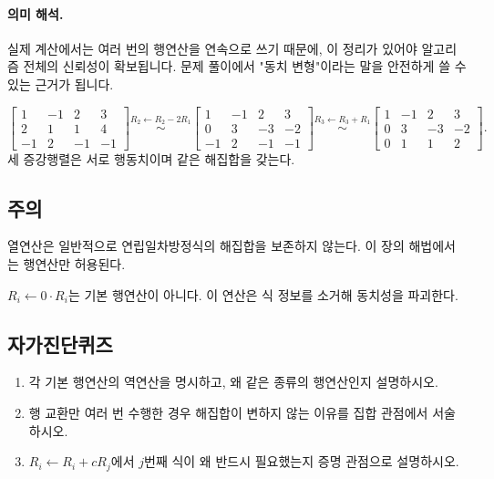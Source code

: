 \paragraph{의미 해석.}
실제 계산에서는 여러 번의 행연산을 연속으로 쓰기 때문에, 이 정리가 있어야 알고리즘 전체의 신뢰성이 확보됩니다. 문제 풀이에서 "동치 변형"이라는 말을 안전하게 쓸 수 있는 근거가 됩니다.

\begin{example}
\[
\left[
\begin{array}{ccc|c}
1&-1&2&3\\
2&1&1&4\\
-1&2&-1&-1
\end{array}
\right]
\overset{R_2\leftarrow R_2-2R_1}{\sim}
\left[
\begin{array}{ccc|c}
1&-1&2&3\\
0&3&-3&-2\\
-1&2&-1&-1
\end{array}
\right]
\overset{R_3\leftarrow R_3+R_1}{\sim}
\left[
\begin{array}{ccc|c}
1&-1&2&3\\
0&3&-3&-2\\
0&1&1&2
\end{array}
\right].
\]
세 증강행렬은 서로 행동치이며 같은 해집합을 갖는다.
\end{example}

\subsection*{주의}
\begin{warning}
열연산은 일반적으로 연립일차방정식의 해집합을 보존하지 않는다. 이 장의 해법에서는 행연산만 허용된다.
\end{warning}
\begin{warning}
$R_i\leftarrow 0\cdot R_i$는 기본 행연산이 아니다. 이 연산은 식 정보를 소거해 동치성을 파괴한다.
\end{warning}

\subsection*{자가진단퀴즈}
\begin{enumerate}[label=\arabic*.]
\item 각 기본 행연산의 역연산을 명시하고, 왜 같은 종류의 행연산인지 설명하시오.
\item 행 교환만 여러 번 수행한 경우 해집합이 변하지 않는 이유를 집합 관점에서 서술하시오.
\item $R_i\leftarrow R_i+cR_j$에서 $j$번째 식이 왜 반드시 필요했는지 증명 관점으로 설명하시오.
\end{enumerate}

